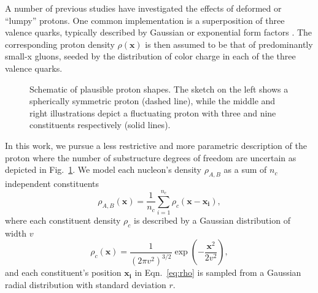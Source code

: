 \documentclass[aps,prc,reprint,amsmath,nofootinbib]{revtex4-1}
\newcommand{\x}{\mathbf{x}}
\begin{document}
A number of previous studies have investigated the effects of deformed or ``lumpy'' protons.
One common implementation is a superposition of three valence quarks, typically described by Gaussian or exponential form factors \cite{Welsh:2016siu, Bozek:2017jog, Schenke:2014zha, Schlichting:2014ipa, Adare:2015bua, Broniowski:2016pvx}.
The corresponding proton density $\rho(\mathbf{x})$ is then assumed to be that of predominantly small-x gluons, seeded by the distribution of color charge in each of the three valence quarks.

\begin{figure}
  \caption{Schematic of plausible proton shapes. The sketch on the left shows a spherically symmetric proton (dashed line), while the middle and right illustrations depict a fluctuating proton with three and nine constituents respectively (solid lines).}
  \label{fig:substructure}
\end{figure}

In this work, we pursue a less restrictive and more parametric description of the proton where the number of substructure degrees of freedom are uncertain as depicted in Fig.~\ref{fig:substructure}.
We model each nucleon's density $\rho_{A,B}$ as a sum of $n_c$ independent constituents
\begin{equation}
  \label{eq:rho}
  \rho_{A, B}(\x) = \frac{1}{n_c} \sum\limits_{i=1}^{n_c} \rho_c(\mathbf{x} - \mathbf{x_i}),
\end{equation}
where each constituent density $\rho_c$ is described by a Gaussian distribution of width $v$
\begin{equation}
  \label{eq:constituent_density}
  \rho_c(\mathbf{x}) = \frac{1}{(2\pi v^2)^{3/2}} \exp\left(-\frac{\x^2}{2 v^2}\right),
\end{equation}
and each constituent's position $\mathbf{x_i}$ in Eqn.~\eqref{eq:rho} is sampled from a Gaussian radial distribution with standard deviation $r$.
\end{document}
